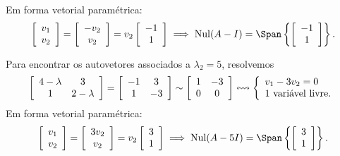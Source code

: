 \begin{ex}
\begin{equation}
	\end{equation} Em forma vetorial paramétrica:
	\begin{equation}
	\left[
	\begin{array}{c}
	v_1 \\
	v_2
	\end{array}
	\right] =
	\left[
	\begin{array}{c}
	-v_2 \\
	v_2
	\end{array}
	\right] = v_2
	\left[
	\begin{array}{c}
	-1 \\
	1
	\end{array}
	\right] \implies \operatorname{Nul} (A - I) = \Span \left\{ \left[
	\begin{array}{c}
	-1 \\
	1
	\end{array}
	\right] \right\}.
	\end{equation}

	Para encontrar os autovetores associados a $\lambda_2 = 5$, resolvemos
	\begin{equation}
	\left[
	\begin{array}{cc}
	4-\lambda & 3 \\
	1 & 2-\lambda
	\end{array}
	\right] =
	\left[
	\begin{array}{cc}
	-1 & 3 \\
	1 & -3
	\end{array}
	\right] \sim
	\left[
	\begin{array}{cc}
	1 & -3 \\
	0 &  0
	\end{array}
	\right] \leftrightsquigarrow
	\left\{
	\begin{array}{ll}
	v_1 - 3 v_2 = 0 \\
	\hbox{1 variável livre.}
	\end{array}
	\right.
	\end{equation} Em forma vetorial paramétrica:
	\begin{equation}
	\left[
	\begin{array}{c}
	v_1 \\
	v_2
	\end{array}
	\right] =
	\left[
	\begin{array}{c}
	3v_2 \\
	v_2
	\end{array}
	\right] = v_2
	\left[
	\begin{array}{c}
	3 \\
	1
	\end{array}
	\right] \implies \operatorname{Nul} (A - 5 I) = \Span \left\{ \left[
	\begin{array}{c}
	3 \\
	1
	\end{array}
	\right] \right\}.
	\end{equation}
\end{ex}

